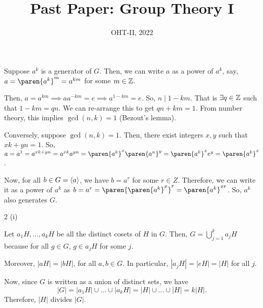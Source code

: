 \documentclass[11pt]{penrose}
\title{Past Paper: Group Theory I}
\subtitle{OHT-II, 2022}
\begin{document}
\maketitle
\warningtext

\begin{problem}{1}

    Suppose $a^k$ is a generator of $G$. Then, we can write $a$ as a power of $a^k$, say, $a = \paren{a^k}^m = a^{km}$ for some $m \in \mathbb{Z}$.

    Then, $a = a^{km} \implies a a^{-km} = e \implies a^{1-km} = e$. So, $n \mid 1 - km$. That is $\exists q \in \mathbb{Z}$ such that $1 - km = qn$. We can re-arrange this to get $qn + km = 1$. From number theory, this implies $\gcd(n,k)=1$ (Bezout's lemma).

    Conversely, suppose $\gcd(n,k)=1$. Then, there exist integers $x, y$ such that $xk + yn = 1$. So, $a = a^1 = a^{xk + yn} = a^{xk} a^{yn} = \paren{a^{k}}^{x} \paren{a^{n}}^{y} = \paren{a^{k}}^{x} e^{y} = \paren{a^{k}}^{x}$.

    Now, for all $b \in G=\langle a\rangle$, we have $b = a^r$ for some $r \in Z$. Therefore, we can write it as a power of $a^k$ as $b = a^r = \paren{\paren{a^{k}}^{x}}^{r} = \paren{a^{k}}^{xr}$. So, $a^k$ also generates $G$.
\end{problem}

\begin{problem}{2 (i)}

    Let $a_1 H, \dots, a_k H$ be all the distinct cosets of $H$ in $G$. Then, $G = \bigcup_{j=1}^{k} a_j H$ because for all $g \in G$, $g \in a_j H$ for some $j$.

    Moreover, $|aH| = |bH|$, for all $a, b \in G$. In particular, $|a_j H| = |e H| = |H|$ for all $j$.

    Now, since $G$ is written as a union of distinct sets, we have
    \begin{equation*}
        |G| = |a_1 H| \cup \dots \cup |a_k H| = |H| \cup \dots \cup |H| = k |H|.
    \end{equation*}
    Therefore, $|H|$ divides $|G|$.
\end{problem}
\end{document}
